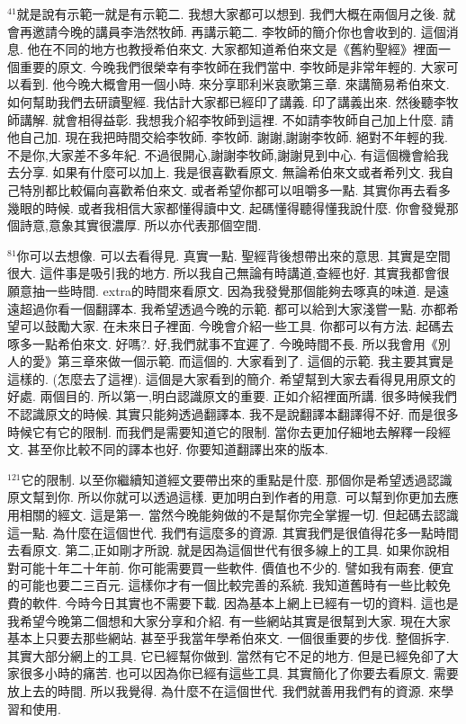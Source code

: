 \documentclass{book}
\begin{document}
$^{41}$就是說有示範一就是有示範二.
我想大家都可以想到.
我們大概在兩個月之後.
就會再邀請今晚的講員李浩然牧師.
再講示範二.
李牧師的簡介你也會收到的.
這個消息.
他在不同的地方也教授希伯來文.
大家都知道希伯來文是《舊約聖經》裡面一個重要的原文.
今晚我們很榮幸有李牧師在我們當中.
李牧師是非常年輕的.
大家可以看到.
他今晚大概會用一個小時.
來分享耶利米哀歌第三章.
來講簡易希伯來文.
如何幫助我們去研讀聖經.
我估計大家都已經印了講義.
印了講義出來.
然後聽李牧師講解.
就會相得益彰.
我想我介紹李牧師到這裡.
不如請李牧師自己加上什麼.
請他自己加.
現在我把時間交給李牧師.
李牧師.
謝謝,謝謝李牧師.
絕對不年輕的我.
不是你,大家差不多年紀.
不過很開心,謝謝李牧師,謝謝見到中心.
有這個機會給我去分享.
如果有什麼可以加上.
我是很喜歡看原文.
無論希伯來文或者希列文.
我自己特別都比較偏向喜歡希伯來文.
或者希望你都可以咀嚼多一點.
其實你再去看多幾眼的時候.
或者我相信大家都懂得讀中文.
起碼懂得聽得懂我說什麼.
你會發覺那個詩意,意象其實很濃厚.
所以亦代表那個空間.

$^{81}$你可以去想像.
可以去看得見.
真實一點.
聖經背後想帶出來的意思.
其實是空間很大.
這件事是吸引我的地方.
所以我自己無論有時講道,查經也好.
其實我都會很願意抽一些時間.
extra的時間來看原文.
因為我發覺那個能夠去啄真的味道.
是遠遠超過你看一個翻譯本.
我希望透過今晚的示範.
都可以給到大家淺嘗一點.
亦都希望可以鼓勵大家.
在未來日子裡面.
今晚會介紹一些工具.
你都可以有方法.
起碼去啄多一點希伯來文.
好嗎?.
好,我們就事不宜遲了.
今晚時間不長.
所以我會用《別人的愛》第三章來做一個示範.
而這個的.
大家看到了.
這個的示範.
我主要其實是這樣的.
(怎麼去了這裡).
這個是大家看到的簡介.
希望幫到大家去看得見用原文的好處.
兩個目的.
所以第一,明白認識原文的重要.
正如介紹裡面所講.
很多時候我們不認識原文的時候.
其實只能夠透過翻譯本.
我不是說翻譯本翻譯得不好.
而是很多時候它有它的限制.
而我們是需要知道它的限制.
當你去更加仔細地去解釋一段經文.
甚至你比較不同的譯本也好.
你要知道翻譯出來的版本.

$^{121}$它的限制.
以至你繼續知道經文要帶出來的重點是什麼.
那個你是希望透過認識原文幫到你.
所以你就可以透過這樣.
更加明白到作者的用意.
可以幫到你更加去應用相關的經文.
這是第一.
當然今晚能夠做的不是幫你完全掌握一切.
但起碼去認識這一點.
為什麼在這個世代.
我們有這麼多的資源.
其實我們是很值得花多一點時間去看原文.
第二,正如剛才所說.
就是因為這個世代有很多線上的工具.
如果你說相對可能十年二十年前.
你可能需要買一些軟件.
價值也不少的.
譬如我有兩套.
便宜的可能也要二三百元.
這樣你才有一個比較完善的系統.
我知道舊時有一些比較免費的軟件.
今時今日其實也不需要下載.
因為基本上網上已經有一切的資料.
這也是我希望今晚第二個想和大家分享和介紹.
有一些網站其實是很幫到大家.
現在大家基本上只要去那些網站.
甚至乎我當年學希伯來文.
一個很重要的步伐.
整個拆字.
其實大部分網上的工具.
它已經幫你做到.
當然有它不足的地方.
但是已經免卻了大家很多小時的痛苦.
也可以因為你已經有這些工具.
其實簡化了你要去看原文.
需要放上去的時間.
所以我覺得.
為什麼不在這個世代.
我們就善用我們有的資源.
來學習和使用.
\end{document}
